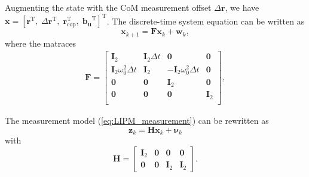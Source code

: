
Augmenting the state with the CoM measurement offset $\Delta\bm{r}$, we have $\bm{x} = [\bm{r}^\mathrm{T} ,\; \Delta\bm{r}^\mathrm{T},\; \bm{r}_{\mathrm{cop}}^\mathrm{T} ,\; \bm{b_u}^\mathrm{T} ]^\mathrm{T}$. The discrete-time system equation can be written as
\[
\bm{x}_{k+1} = \bm{Fx}_{k} + \bm{w}_{k},
\]
where the matraces
\[
\begin{split}
    \bm{F} =
    \begin{bmatrix}
        \bm{I}_2 & \bm{I}_2\Delta t & \bm{0} & \bm{0} \\
        \bm{I}_2\omega_0^2\Delta t & \bm{I}_2 & -\bm{I}_2 \omega_0^2 \Delta t & \bm{0} \\
        \bm{0} & \bm{0} & \bm{I}_2 & \bm{0} \\
        \bm{0} & \bm{0} & \bm{0} & \bm{I}_2 \\
    \end{bmatrix},
\end{split}
\]

The measurement model (\ref{eq:LIPM_measurement}) can be rewritten as
\[
    \bm{z}_{k} = \bm{H x}_{k} + \bm{\nu}_{k}
\]
with
\[
    \bm{H} = 
    \begin{bmatrix}
        \bm{I}_2 & \bm{0}  & \bm{0} & \bm{0}  \\
        \bm{0} & \bm{0}  & \bm{I}_2 & \bm{I}_2
    \end{bmatrix}.
\]
